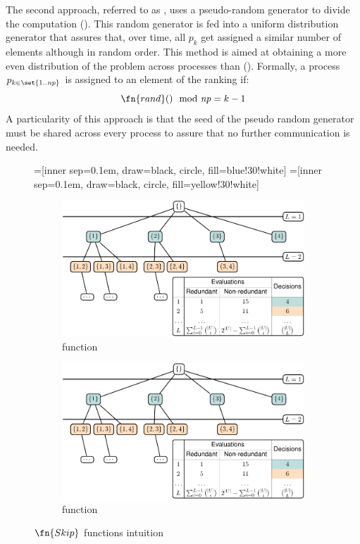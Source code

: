 The second approach, referred to as \randomFn{}, uses a
pseudo-random generator to divide the computation ().
%
This random generator is fed into a uniform distribution generator
that assures that, over time, all $p_k$ get assigned a similar number
of elements although in random order.
%
This method is aimed at obtaining a more even distribution of the
problem across processes than \strideFn{}
().
%
Formally, a process $p_{k \in\set{1..\nproc}}$ is assigned to an element of
the ranking if:
\begin{equation}
  \fn{rand}() \mod{\nproc} = k - 1
\end{equation}
%
A particularity of this approach is that the seed of the pseudo random
generator must be shared across every process to assure that no
further communication is needed.
\begin{figure}[!ht]
  =[inner sep=0.1em, draw=black, circle, fill=blue!30!white]
  =[inner sep=0.1em, draw=black, circle, fill=yellow!30!white]
  \begin{subfigure}{0.48\columnwidth}
    \centering
    \includegraphics[page=2]{figures/mhs2/figures/parallel/main}
    \caption{\strideFn{} function\label{fig:mhs2p:skip-fn-stride}}
  \end{subfigure}
  \hfill{}
  \begin{subfigure}{0.48\columnwidth}
    \centering
    \includegraphics[page=3]{figures/mhs2/figures/parallel/main}
    \caption{\randomFn{} function\label{fig:mhs2p:skip-fn-random}}
  \end{subfigure}
  \caption{$\fn{Skip}$ functions intuition\label{fig:mhs2p:skip-fn}}

\end{figure}

